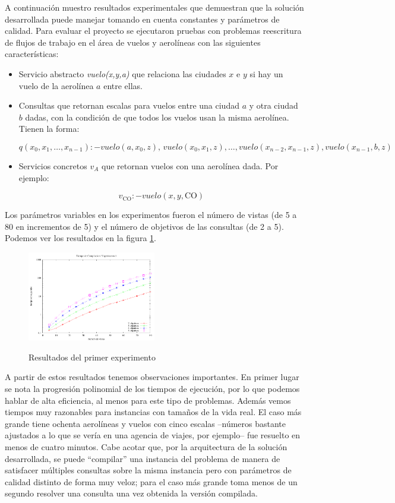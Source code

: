 \documentclass{article}
\begin{document}
A continuación muestro resultados experimentales que demuestran que la solución
desarrollada puede manejar tomando en cuenta constantes y parámetros de calidad.
Para evaluar el proyecto se ejecutaron pruebas con problemas reescritura de
flujos de trabajo en el área de vuelos y aerolíneas con las siguientes
características:

\begin{itemize}

\item Servicio abstracto {\it vuelo(x,y,a)} que relaciona las ciudades $x$ e $y$
si hay un vuelo de la aerolínea $a$ entre ellas.

\item Consultas que retornan escalas para vuelos entre una ciudad $a$ y otra
ciudad $b$ dadas, con la condición de que todos los vuelos usan la misma
aerolínea. Tienen la forma:

$$
q(x_0,x_1,\ldots,x_{n-1}) :- vuelo(a,x_0,z),\, vuelo(x_0,x_1,z), \ldots, vuelo(x_{n-2},x_{n-1},z), vuelo(x_{n-1},b,z)
$$

\item Servicios concretos $v_A$ que retornan vuelos con una aerolínea dada. Por
ejemplo:

$$
v_{\mathrm{CO}} :- vuelo(x,y,\mathrm{CO})
$$

\end{itemize}

Los parámetros variables en los experimentos fueron el número de vistas (de 5 a
80 en incrementos de 5) y el
número de objetivos de las consultas (de 2 a 5). Podemos ver los resultados en la
figura \ref{grafico:plot1}.

\begin{figure}[h!]
  \caption{Resultados del primer experimento}
  \centering
   \includegraphics[width=0.5\textwidth]{plot1}
  \label{grafico:plot1}
\end{figure}

A partir de estos resultados tenemos observaciones importantes. En primer lugar
se nota la progresión polinomial de los tiempos de ejecución, por lo que podemos
hablar de alta eficiencia, al menos para este tipo de problemas. Además vemos
tiempos muy razonables para instancias con tamaños de la vida real. El caso más
grande tiene ochenta aerolíneas y vuelos con cinco escalas --números bastante
ajustados a lo que se vería en una agencia de viajes, por ejemplo-- fue resuelto
en menos de cuatro minutos. Cabe acotar que, por la arquitectura de la solución
desarrollada, se puede ``compilar'' una instancia del problema de manera de
satisfacer múltiples consultas sobre la misma instancia pero con parámetros de
calidad distinto de forma muy veloz; para el caso más grande toma menos de un
segundo resolver una consulta una vez obtenida la versión compilada.
\end{document}
